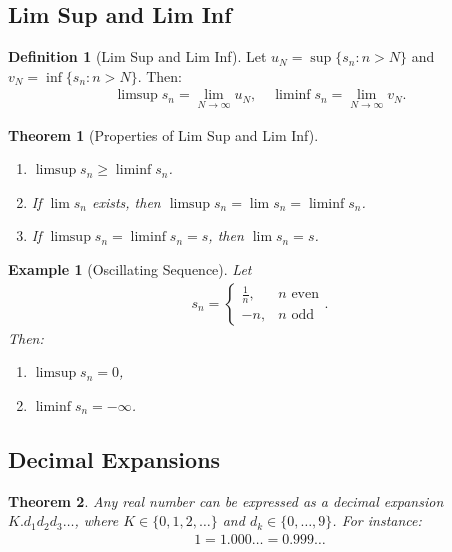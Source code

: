 \documentclass[9pt]{article}
\theoremstyle{definition}
\newtheorem{definition}{Definition}
\theoremstyle{plain}
\newtheorem{theorem}{Theorem}
\newtheorem{example}{Example}
\begin{document}
\subsection*{Lim Sup and Lim Inf}
\begin{definition}[Lim Sup and Lim Inf]
Let $ u_N = \sup\{s_n : n > N\} $ and $ v_N = \inf\{s_n : n > N\} $. Then:
\begin{align}
\limsup s_n = \lim_{N \to \infty} u_N, \quad \liminf s_n = \lim_{N \to \infty} v_N.
\end{align}
\end{definition}

\begin{theorem}[Properties of Lim Sup and Lim Inf]

\begin{enumerate}
    \item $ \limsup s_n \geq \liminf s_n $.
    \item If $ \lim s_n $ exists, then $ \limsup s_n = \lim s_n = \liminf s_n $.
    \item If $ \limsup s_n = \liminf s_n = s $, then $ \lim s_n = s $.
\end{enumerate}
\end{theorem}

\begin{example}[Oscillating Sequence]
Let \begin{align} s_n = 
\begin{cases} 
\frac{1}{n}, & n \text{ even} \\
-n, & n \text{ odd}
\end{cases}.
\end{align}
Then:
\begin{enumerate}
    \item $ \limsup s_n = 0 $,
    \item $ \liminf s_n = -\infty $.
\end{enumerate}
\end{example}

\subsection*{Decimal Expansions}
\begin{theorem}
Any real number can be expressed as a decimal expansion $ K.d_1d_2d_3\ldots $, where $ K \in \{0, 1, 2, \dots \} $ and $ d_k \in \{0, \ldots, 9\} $. For instance:
\begin{align}
1 = 1.000\ldots = 0.999\ldots
\end{align}
\end{theorem}
\end{document}
